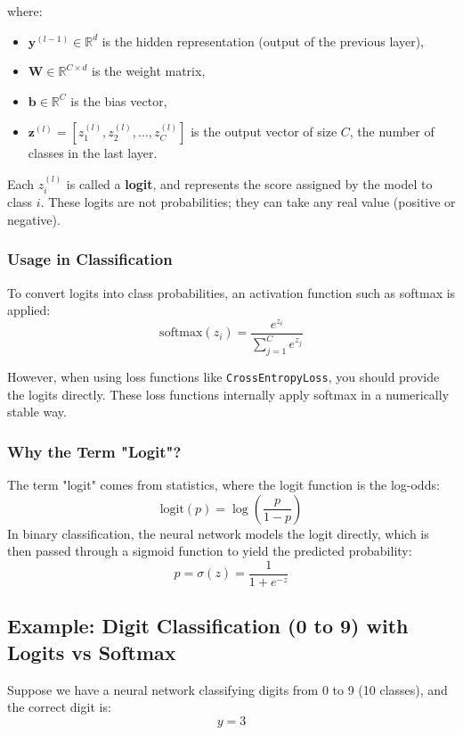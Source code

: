 where:
\begin{itemize}
	\item $\mathbf{y}^{(l-1)} \in \mathbb{R}^d$ is the hidden representation (output of the previous layer),
	\item $\mathbf{W} \in \mathbb{R}^{C \times d}$ is the weight matrix,
	\item $\mathbf{b} \in \mathbb{R}^C$ is the bias vector,
	\item $\mathbf{z}^{(l)} = [z_1^{(l)}, z_2^{(l)}, \dots, z_C^{(l)}]$ is the output vector of size $C$, the number of classes in the last layer.
\end{itemize}

Each $z_i^{(l)}$ is called a \textbf{logit}, and represents the score assigned by the model to class $i$. These logits are not probabilities; they can take any real value (positive or negative).

\subsubsection*{Usage in Classification}

To convert logits into class probabilities, an activation function such as softmax is applied:
\[
\text{softmax}(z_i) = \frac{e^{z_i}}{\sum_{j=1}^{C} e^{z_j}}
\]

However, when using loss functions like \texttt{CrossEntropyLoss}, you should provide the logits directly. These loss functions internally apply softmax in a numerically stable way.

\subsubsection*{Why the Term "Logit"?}

The term "logit" comes from statistics, where the logit function is the log-odds:
\[
\text{logit}(p) = \log\left( \frac{p}{1 - p} \right)
\]
In binary classification, the neural network models the logit directly, which is then passed through a sigmoid function to yield the predicted probability:
\[
p = \sigma(z) = \frac{1}{1 + e^{-z}}
\]

\subsection*{Example: Digit Classification (0 to 9) with Logits vs Softmax}

Suppose we have a neural network classifying digits from 0 to 9 (10 classes), and the correct digit is:
\[
y = 3
\]

